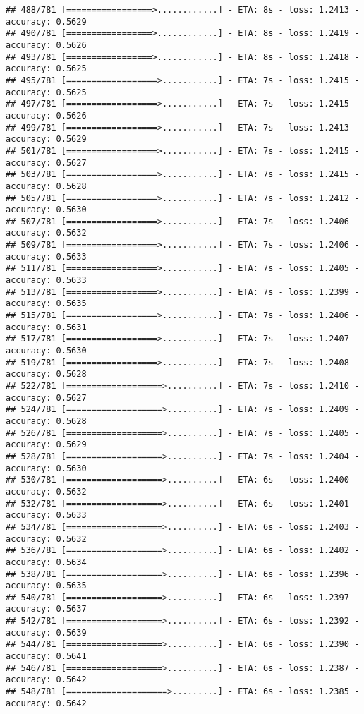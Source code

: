 \documentclass[
]{article}
\begin{document}
\begin{verbatim}
## 488/781 [=================>............] - ETA: 8s - loss: 1.2413 - accuracy: 0.5629
## 490/781 [=================>............] - ETA: 8s - loss: 1.2419 - accuracy: 0.5626
## 493/781 [=================>............] - ETA: 8s - loss: 1.2418 - accuracy: 0.5625
## 495/781 [==================>...........] - ETA: 7s - loss: 1.2415 - accuracy: 0.5625
## 497/781 [==================>...........] - ETA: 7s - loss: 1.2415 - accuracy: 0.5626
## 499/781 [==================>...........] - ETA: 7s - loss: 1.2413 - accuracy: 0.5629
## 501/781 [==================>...........] - ETA: 7s - loss: 1.2415 - accuracy: 0.5627
## 503/781 [==================>...........] - ETA: 7s - loss: 1.2415 - accuracy: 0.5628
## 505/781 [==================>...........] - ETA: 7s - loss: 1.2412 - accuracy: 0.5630
## 507/781 [==================>...........] - ETA: 7s - loss: 1.2406 - accuracy: 0.5632
## 509/781 [==================>...........] - ETA: 7s - loss: 1.2406 - accuracy: 0.5633
## 511/781 [==================>...........] - ETA: 7s - loss: 1.2405 - accuracy: 0.5633
## 513/781 [==================>...........] - ETA: 7s - loss: 1.2399 - accuracy: 0.5635
## 515/781 [==================>...........] - ETA: 7s - loss: 1.2406 - accuracy: 0.5631
## 517/781 [==================>...........] - ETA: 7s - loss: 1.2407 - accuracy: 0.5630
## 519/781 [==================>...........] - ETA: 7s - loss: 1.2408 - accuracy: 0.5628
## 522/781 [===================>..........] - ETA: 7s - loss: 1.2410 - accuracy: 0.5627
## 524/781 [===================>..........] - ETA: 7s - loss: 1.2409 - accuracy: 0.5628
## 526/781 [===================>..........] - ETA: 7s - loss: 1.2405 - accuracy: 0.5629
## 528/781 [===================>..........] - ETA: 7s - loss: 1.2404 - accuracy: 0.5630
## 530/781 [===================>..........] - ETA: 6s - loss: 1.2400 - accuracy: 0.5632
## 532/781 [===================>..........] - ETA: 6s - loss: 1.2401 - accuracy: 0.5633
## 534/781 [===================>..........] - ETA: 6s - loss: 1.2403 - accuracy: 0.5632
## 536/781 [===================>..........] - ETA: 6s - loss: 1.2402 - accuracy: 0.5634
## 538/781 [===================>..........] - ETA: 6s - loss: 1.2396 - accuracy: 0.5635
## 540/781 [===================>..........] - ETA: 6s - loss: 1.2397 - accuracy: 0.5637
## 542/781 [===================>..........] - ETA: 6s - loss: 1.2392 - accuracy: 0.5639
## 544/781 [===================>..........] - ETA: 6s - loss: 1.2390 - accuracy: 0.5641
## 546/781 [===================>..........] - ETA: 6s - loss: 1.2387 - accuracy: 0.5642
## 548/781 [====================>.........] - ETA: 6s - loss: 1.2385 - accuracy: 0.5642

\end{verbatim}
\end{document}
